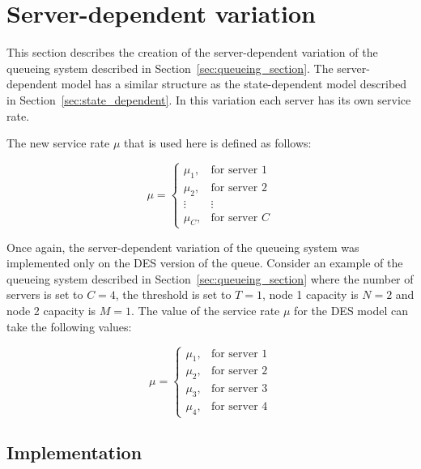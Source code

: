 \section{Server-dependent variation}\label{sec:server_dependent}

This section describes the creation of the server-dependent variation of the
queueing system described in Section~\ref{sec:queueing_section}.
The server-dependent model has a similar structure as the state-dependent model
described in Section~\ref{sec:state_dependent}.
In this variation each server has its own service rate.

The new service rate \(\mu\) that is used here is defined as follows:

\begin{equation*}
    \mu =
    \begin{cases}
        \mu_1, & \text{for server } 1 \\
        \mu_2, & \text{for server } 2 \\
        \vdots & \vdots \\
        \mu_C, & \text{for server } C
    \end{cases}
\end{equation*}

Once again, the server-dependent variation of the queueing system was
implemented only on the DES version of the queue.
Consider an example of the queueing system described in
Section~\ref{sec:queueing_section} where the number of servers is set to
\(C = 4\), the threshold is set to \(T = 1\), node 1 capacity is \(N = 2\) and
node 2 capacity is \(M = 1\).
The value of the service rate \(\mu\) for the DES model can take the following
values:

\begin{equation*}
    \mu =
    \begin{cases}
        \mu_1, & \text{for server } 1 \\
        \mu_2, & \text{for server } 2 \\
        \mu_3, & \text{for server } 3 \\
        \mu_4, & \text{for server } 4
    \end{cases}
\end{equation*}



\subsection{Implementation}

